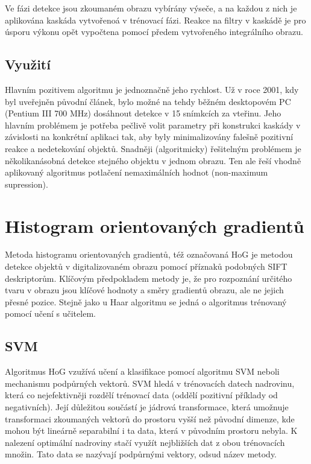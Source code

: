 	Ve fázi detekce jsou zkoumaném obrazu vybírány výseče, a na každou z nich je aplikována kaskáda vytvořenoá v trénovací fázi. Reakce na filtry v kaskádě je pro úsporu výkonu opět vypočtena pomocí předem vytvořeného integrálního obrazu.	
	
	\subsection{Využití}
	
	Hlavním pozitivem algoritmu je jednoznačně jeho rychlost. Už v roce 2001, kdy byl uveřejněn původní článek, bylo možné na tehdy běžném desktopovém PC (Pentium III 700 MHz) dosáhnout detekce v 15 snímkcích za vteřinu. Jeho hlavním problémem je potřeba pečlivě volit parametry při konstrukci kaskády v závislosti na konkrétní aplikaci tak, aby byly minimalizovány falešně pozitivní reakce a nedetekování objektů. Snadněji (algoritmicky) řešitelným problémem je několikanásobná detekce stejného objektu v jednom obrazu. Ten ale řeší vhodně aplikovaný algoritmus potlačení nemaximálních hodnot (non-maximum supression).
 
\section{Histogram orientovaných gradientů}

	Metoda histogramu orientovaných gradientů, též označovaná HoG je metodou detekce objektů v digitalizovaném obrazu pomocí příznaků podobných SIFT deskriptorům. Klíčovým předpokladem metody je, že pro rozpoznání určitého tvaru v obrazu jsou klíčové hodnoty a směry gradientů obrazu, ale ne jejich přesné pozice. Stejně jako u Haar algoritmu se jedná o algoritmus trénovaný pomocí učení s učitelem.
	
	\subsection{SVM}
	
	Algoritmus HoG vzužívá učení a klasifikace pomocí algoritmu SVM neboli mechanismu podpůrných vektorů. SVM hledá v trénovacích datech nadrovinu, která co nejefektivněji rozdělí trénovací data (oddělí pozitivní příklady od negativních). Její důležitou součástí je jádrová transformace, která umožnuje transformaci zkoumaných vektorů do prostoru vyšší než původní dimenze, kde mohou být lineárně separabilní i ta data, která v původním prostoru nebyla. K nalezení optimální nadroviny stačí využít nejbližších dat z obou trénovacích množin. Tato data se nazývají podpůrnými vektory, odsud název metody.
	
